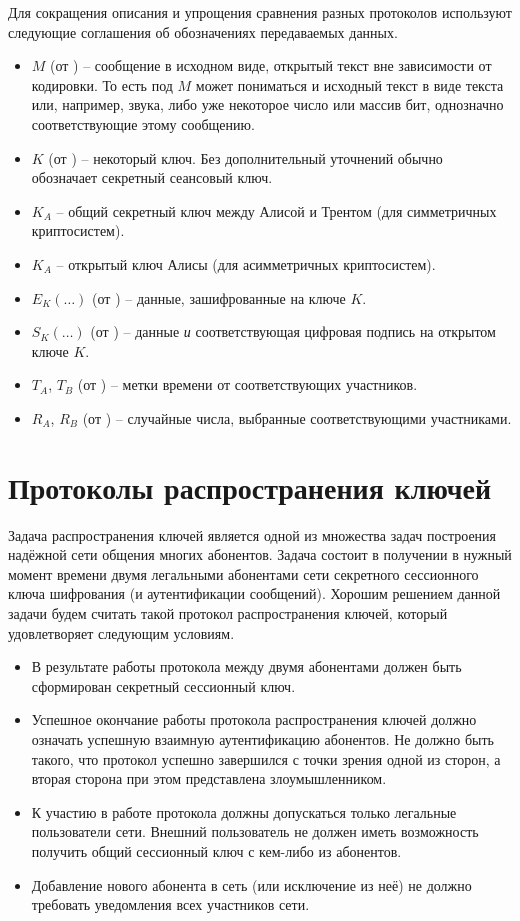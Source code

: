 Для сокращения описания и упрощения сравнения разных протоколов используют следующие соглашения об обозначениях передаваемых данных.

\begin{itemize}
	\item $M$ (от ) -- сообщение в исходном виде, открытый текст вне зависимости от кодировки. То есть под $M$ может пониматься и исходный текст в виде текста или, например, звука, либо уже некоторое число или массив бит, однозначно соответствующие этому сообщению.
	\item $K$ (от ) -- некоторый ключ. Без дополнительный уточнений обычно обозначает секретный сеансовый ключ.
	\item $K_A$ -- общий секретный ключ между Алисой и Трентом (для симметричных криптосистем).
	\item $K_A$ -- открытый ключ Алисы (для асимметричных криптосистем).
	\item $E_K( \dots )$ (от ) -- данные, зашифрованные на ключе $K$.
	\item $S_K( \dots )$ (от ) -- данные \emph{и} соответствующая цифровая подпись на открытом ключе $K$.
	\item $T_A$, $T_B$ (от ) -- метки времени от соответствующих участников.
	\item $R_A$, $R_B$ (от ) -- случайные числа, выбранные соответствующими участниками.
\end{itemize}

\section{Протоколы распространения ключей}

Задача распространения ключей является одной из множества задач построения надёжной сети общения многих абонентов. Задача состоит в получении в нужный момент времени двумя легальными абонентами сети секретного сессионного ключа шифрования (и аутентификации сообщений). Хорошим решением данной задачи будем считать такой протокол распространения ключей, который удовлетворяет следующим условиям.

\begin{itemize}
	\item В результате работы протокола между двумя абонентами должен быть сформирован секретный сессионный ключ.
	\item Успешное окончание работы протокола распространения ключей должно означать успешную взаимную аутентификацию абонентов. Не должно быть такого, что протокол успешно завершился с точки зрения одной из сторон, а вторая сторона при этом представлена злоумышленником.
	\item К участию в работе протокола должны допускаться только легальные пользователи сети. Внешний пользователь не должен иметь возможность получить общий сессионный ключ с кем-либо из абонентов.
	\item Добавление нового абонента в сеть (или исключение из неё) не должно требовать уведомления всех участников сети.
\end{itemize}


